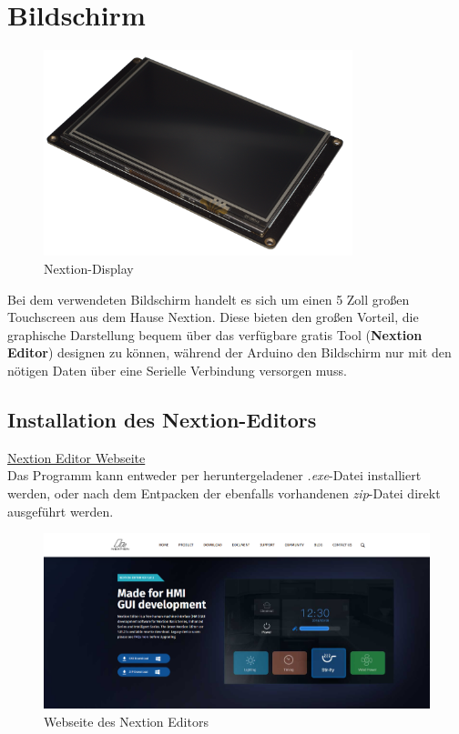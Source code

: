 \section{Bildschirm}
\begin{figure}[h]
    \centering
    \includegraphics[width=0.8\textwidth]{Fotos/Nextion_Display.png}
    \caption{Nextion-Display}
\end{figure}
Bei dem verwendeten Bildschirm handelt es sich um einen 5 Zoll großen Touchscreen aus dem Hause Nextion.
Diese bieten den großen Vorteil, die graphische Darstellung bequem über das verfügbare gratis Tool (\textbf{Nextion Editor}) designen zu können, während der Arduino den Bildschirm nur mit den nötigen Daten über eine Serielle Verbindung versorgen muss. 

\newpage
\subsection{Installation des Nextion-Editors}
\href{https://nextion.tech/nextion-editor/}{Nextion Editor Webseite}\\
Das Programm kann entweder per heruntergeladener \textit{.exe}-Datei installiert werden, oder nach dem Entpacken der ebenfalls vorhandenen \textit{zip}-Datei direkt ausgeführt werden.
\begin{figure}[h]
    \centering
    \includegraphics[width=1\textwidth]{bilder/Nextion_Webseite.png}
    \caption{Webseite des Nextion Editors}
\end{figure}


